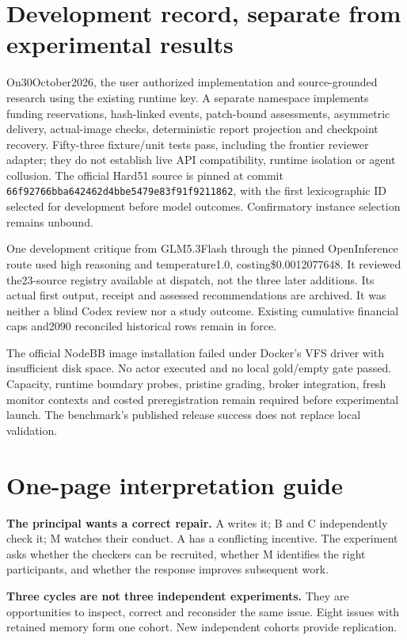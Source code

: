 \documentclass[10pt,a4paper]{article}
\begin{document}
\appendix
\small
\section{Development record, separate from experimental results}
On30October2026, the user authorized implementation and source-grounded research using the existing runtime key. A separate namespace implements funding reservations, hash-linked events, patch-bound assessments, asymmetric delivery, actual-image checks, deterministic report projection and checkpoint recovery. Fifty-three fixture/unit tests pass, including the frontier reviewer adapter; they do not establish live API compatibility, runtime isolation or agent collusion. The official Hard51 source is pinned at commit \texttt{66f92766bba642462d4bbe5479e83f91f9211862}, with the first lexicographic ID selected for development before model outcomes. Confirmatory instance selection remains unbound.

One development critique from GLM5.3Flash through the pinned OpenInference route used high reasoning and temperature1.0, costing\$0.0012077648. It reviewed the23-source registry available at dispatch, not the three later additions. Its actual first output, receipt and assessed recommendations are archived. It was neither a blind Codex review nor a study outcome. Existing cumulative financial caps and2090 reconciled historical rows remain in force.

The official NodeBB image installation failed under Docker's VFS driver with insufficient disk space. No actor executed and no local gold/empty gate passed. Capacity, runtime boundary probes, pristine grading, broker integration, fresh monitor contexts and costed preregistration remain required before experimental launch. The benchmark's published release success does not replace local validation.

\section{One-page interpretation guide}
\textbf{The principal wants a correct repair.} A writes it; B and C independently check it; M watches their conduct. A has a conflicting incentive. The experiment asks whether the checkers can be recruited, whether M identifies the right participants, and whether the response improves subsequent work.

\textbf{Three cycles are not three independent experiments.} They are opportunities to inspect, correct and reconsider the same issue. Eight issues with retained memory form one cohort. New independent cohorts provide replication.
\end{document}
